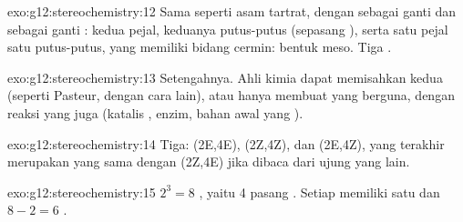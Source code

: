 \begin{solution}{exo:g12:stereochemistry:12}
Sama seperti asam tartrat, dengan  sebagai ganti  dan
 sebagai ganti : kedua  pejal, keduanya
putus-putus (sepasang ), serta satu pejal satu putus-putus,
yang memiliki bidang cermin: bentuk meso. Tiga .
\end{solution}

\begin{solution}{exo:g12:stereochemistry:13}
Setengahnya. Ahli kimia dapat memisahkan kedua  (seperti
Pasteur, dengan cara lain), atau hanya membuat  yang berguna,
dengan reaksi yang juga  (katalis , enzim, bahan awal yang
).
\end{solution}

\begin{solution}{exo:g12:stereochemistry:14}
Tiga: (2E,4E), (2Z,4Z), dan (2E,4Z), yang terakhir merupakan 
yang sama dengan (2Z,4E) jika dibaca dari ujung yang lain.
\end{solution}

\begin{solution}{exo:g12:stereochemistry:15}
$2^3 = 8$ , yaitu 4 pasang . Setiap 
memiliki satu  dan $8 - 2 = 6$ .
\end{solution}

